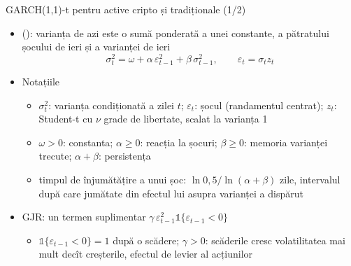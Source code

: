 \begin{frame}{GARCH(1,1)-t pentru active cripto și tradiționale (1/2)}
\itemsize{\small}
\begin{itemize}
    \item {} (): varianța de azi este o sumă ponderată a unei constante, a pătratului șocului de ieri și a varianței de ieri \[ \sigma_t^2 = \omega + \alpha\,\varepsilon_{t-1}^2 + \beta\,\sigma_{t-1}^2, \qquad \varepsilon_t = \sigma_t z_t \]
    \item Notațiile
    \begin{itemize}
        \item $\sigma_t^2$: varianța condiționată a zilei $t$; $\varepsilon_t$: șocul (randamentul centrat); $z_t$: Student-t cu $\nu$ grade de libertate, scalat la varianța 1
        \item $\omega > 0$: constanta; $\alpha \ge 0$: reacția la șocuri; $\beta \ge 0$: memoria varianței trecute; $\alpha + \beta$: persistența
        \item timpul de înjumătățire a unui șoc: $\ln 0{,}5/\ln(\alpha + \beta)$ zile, intervalul după care jumătate din efectul lui asupra varianței a dispărut
    \end{itemize}
    \item GJR: un termen suplimentar $\gamma\,\varepsilon_{t-1}^2\mathbb{1}\{\varepsilon_{t-1} < 0\}$
    \begin{itemize}
        \item $\mathbb{1}\{\varepsilon_{t-1} < 0\} = 1$ după o scădere; $\gamma > 0$: scăderile cresc volatilitatea mai mult decît creșterile, efectul de levier al acțiunilor
    \end{itemize}
\end{itemize}
\end{frame}

